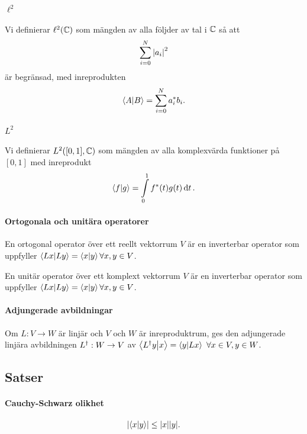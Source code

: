 \paragraph{$\ell^{2}$}
Vi definierar $\ell^{2}(\mathbb{C})$ som mängden av alla följder av tal i $\mathbb{C}$ så att
\begin{align*}
	\sum\limits_{i = 0}^{N}\abs{a_{i}}^{2}
\end{align*}
är begränsad, med inreprodukten
\begin{align*}
	\bra{A}\ket{B} = \sum\limits_{i = 0}^{N}a_{i}^{*}b_{i}.
\end{align*}

\paragraph{$L^{2}$}
Vi definierar $L^{2}([0, 1], \mathbb{C})$ som mängden av alla komplexvärda funktioner på $[0, 1]$ med inreprodukt
\begin{align*}
	\bra{f}\ket{g} = \int\limits_{0}^{1}f^{*}(t)g(t)\dd{t}.
\end{align*}

\paragraph{Ortogonala och unitära operatorer}
En ortogonal operator över ett reellt vektorrum $V$ är en inverterbar operator som uppfyller $\bra{Lx}\ket{Ly} = \bra{x}\ket{y}\forall x, y\in V$.

En unitär operator över ett komplext vektorrum $V$ är en inverterbar operator som uppfyller $\bra{Lx}\ket{Ly} = \bra{x}\ket{y}\forall x, y\in V$.

\paragraph{Adjungerade avbildningar}
Om $L: V\to W$ är linjär och $V$ och $W$ är inreproduktrum, ges den adjungerade linjära avbildningen $L^{\dagger}: W\to V$ av $\bra{L^{\dagger}y}\ket{x} = \bra{y}\ket{Lx}\ \forall x\in V, y\in W$.

\subsection{Satser}

\paragraph{Cauchy-Schwarz olikhet}

\begin{align*}
	\abs{\bra{x}\ket{y}} \leq \abs{x}\abs{y}.
\end{align*}

